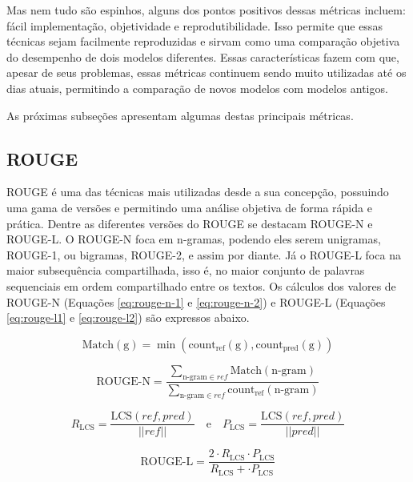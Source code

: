 \documentclass[cic,tc]{iiufrgs}
\begin{document}
Mas nem tudo são espinhos, alguns dos pontos positivos dessas métricas incluem: fácil implementação, objetividade e reprodutibilidade. Isso permite que essas técnicas sejam facilmente reproduzidas e sirvam como uma comparação objetiva do desempenho de dois modelos diferentes. Essas características fazem com que, apesar de seus problemas, essas métricas continuem sendo muito utilizadas até os dias atuais, permitindo a comparação de novos modelos com modelos antigos. 

As próximas subseções apresentam algumas destas principais métricas.

\subsection{ROUGE}
ROUGE \cite{lin2004rouge} é uma das técnicas mais utilizadas desde a sua concepção, possuindo uma gama de versões e permitindo uma análise objetiva de forma rápida e prática. Dentre as diferentes versões do ROUGE \cite{lin2004rouge} se destacam ROUGE-N e ROUGE-L. O ROUGE-N foca em n-gramas, podendo eles serem unigramas, ROUGE-1, ou bigramas, ROUGE-2, e assim por diante. Já o ROUGE-L foca na maior subsequência compartilhada, isso é, no maior conjunto de palavras sequenciais em ordem compartilhado entre os textos. Os cálculos dos valores de ROUGE-N (Equações \ref{eq:rouge-n-1} e \ref{eq:rouge-n-2}) e ROUGE-L (Equações \ref{eq:rouge-l1} e \ref{eq:rouge-l2}) são expressos abaixo.

\begin{equation}
    \label{eq:rouge-n-1}
    \text{Match}(\text{g}) =
    \min\left(\text{count}_{\text{ref}}(\text{g}), \text{count}_{\text{pred}}(\text{g}) \right)
\end{equation}

\begin{equation}
    \label{eq:rouge-n-2}
    \text{ROUGE-N} = 
    \frac{
    \sum_{\text{n-gram} \in ref}
    \text{Match}(\text{n-gram})
    }{
    \sum_{\text{n-gram} \in ref} \text{count}_{\text{ref}}(\text{n-gram})
    }
\end{equation}

\begin{equation}
    \label{eq:rouge-l1} 
    R_{\text{LCS}} = \frac{ \text{LCS}(ref, pred) }{ ||ref|| }
    \quad\text{e}\quad
    P_{\text{LCS}} = \frac{ \text{LCS}(ref, pred) }{ ||pred|| }
\end{equation}

\begin{equation}
    \label{eq:rouge-l2}
    \text{ROUGE-L} =
    \frac{ 2 \cdot R_{\text{LCS}} \cdot P_{\text{LCS}} }
    { R_{\text{LCS}} + \cdot P_{\text{LCS}} }
\end{equation}
\end{document}
